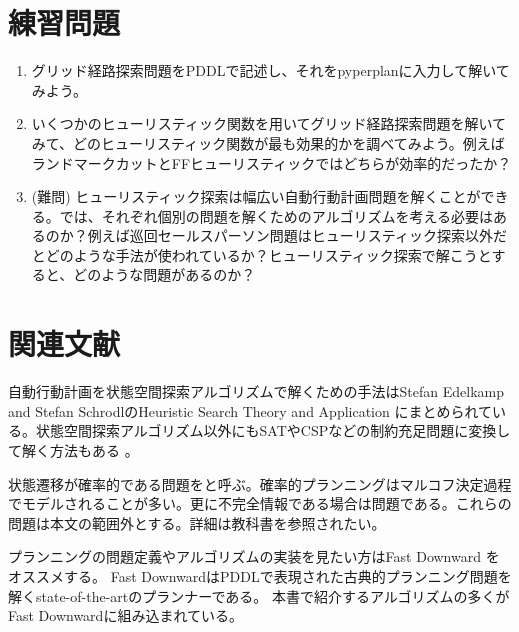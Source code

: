 \section{練習問題}
\begin{enumerate}
	\item グリッド経路探索問題をPDDLで記述し、それをpyperplanに入力して解いてみよう。
	
	\item いくつかのヒューリスティック関数を用いてグリッド経路探索問題を解いてみて、どのヒューリスティック関数が最も効果的かを調べてみよう。例えばランドマークカットとFFヒューリスティックではどちらが効率的だったか？
	
	\item (難問) ヒューリスティック探索は幅広い自動行動計画問題を解くことができる。では、それぞれ個別の問題を解くためのアルゴリズムを考える必要はあるのか？例えば巡回セールスパーソン問題はヒューリスティック探索以外だとどのような手法が使われているか？ヒューリスティック探索で解こうとすると、どのような問題があるのか？
\end{enumerate}

\section{関連文献}

自動行動計画を状態空間探索アルゴリズムで解くための手法はStefan Edelkamp and Stefan SchrodlのHeuristic Search Theory and Application \cite{edelkamp:2010:hst:1875144}にまとめられている。状態空間探索アルゴリズム以外にもSATやCSPなどの制約充足問題に変換して解く方法もある \cite{ernst1997automatic,do2001planning,sharon2015conflict}。

状態遷移が確率的である問題をと呼ぶ。確率的プランニングはマルコフ決定過程でモデルされることが多い。更に不完全情報である場合は問題である。これらの問題は本文の範囲外とする。詳細は教科書を参照されたい\cite{russelln03}。

プランニングの問題定義やアルゴリズムの実装を見たい方はFast Downward \cite{helmert2006}をオススメする。
Fast DownwardはPDDLで表現された古典的プランニング問題を解くstate-of-the-artのプランナーである。
本書で紹介するアルゴリズムの多くがFast Downwardに組み込まれている。
